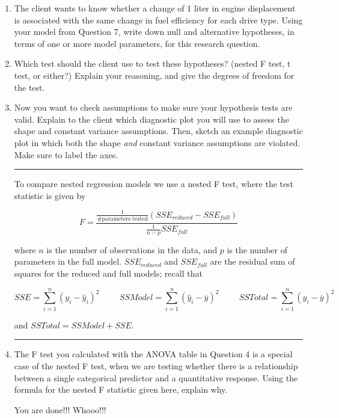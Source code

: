 \documentclass[11pt]{article}
\begin{document}
\begin{enumerate}
\pagebreak

\item The client wants to know whether a change of 1 liter in engine displacement is associated with the same change in fuel efficiency for each drive type. Using your model from Question 7, write down null and alternative hypotheses, in terms of one or more model parameters, for this research question.

\vspace{3cm}

\item Which test should the client use to test these hypotheses? (nested F test, t test, or either?) Explain your reasoning, and give the degrees of freedom for the test.

\vspace{3cm}


\item Now you want to check assumptions to make sure your hypothesis tests are valid. Explain to the client which diagnostic plot you will use to assess the shape and constant variance assumptions. Then, sketch an example diagnostic plot in which both the shape \textit{and} constant variance assumptions are violated. Make sure to label the axes.


\pagebreak

\rule{\textwidth}{1pt}

To compare nested regression models we use a nested F test, where the test statistic is given by

$$F = \dfrac{\frac{1}{\# \text{parameters tested}} (SSE_{reduced} - SSE_{full})}{\frac{1}{n-p} SSE_{full}}$$

where $n$ is the number of observations in the data, and $p$ is the number of parameters in the full model. $SSE_{reduced}$ and $SSE_{full}$ are the residual sum of squares for the reduced and full models; recall that

$$SSE = \sum \limits_{i=1}^n (y_i - \widehat{y}_i)^2 \hspace{1cm} SSModel = \sum \limits_{i=1}^n (\widehat{y}_i - \overline{y})^2 \hspace{1cm} SSTotal = \sum \limits_{i=1}^n (y_i - \overline{y})^2 $$

and $SSTotal = SSModel + SSE$.

\rule{\textwidth}{1pt}


\item The F test you calculated with the ANOVA table in Question 4 is a special case of the nested F test, when we are testing whether there is a relationship between a single categorical predictor and a quantitative response. Using the formula for the nested F statistic given here, explain why.

\pagebreak



\huge{You are done!!! Whooo!!!}




\end{enumerate}
\end{document}
